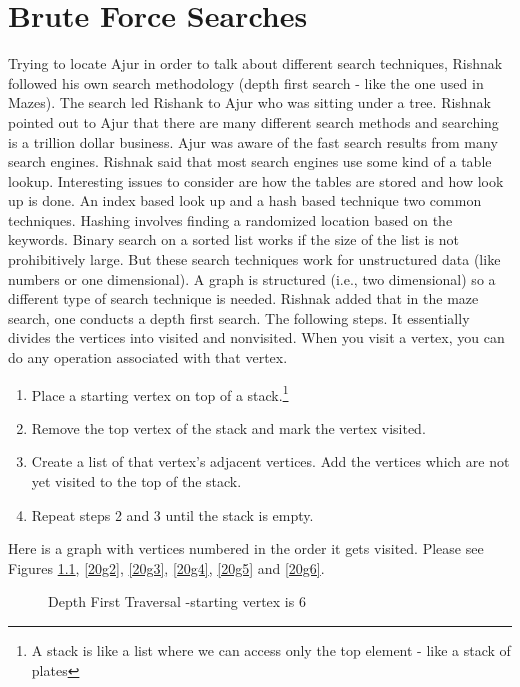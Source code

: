 \chapter{Brute Force Searches}

Trying to locate Ajur in order to talk about different search techniques, Rishnak followed his own search methodology (depth first search - like the one used in Mazes). The search led Rishank to Ajur who was sitting under a tree. Rishnak pointed out to Ajur that there are many different search methods and searching is a trillion dollar business. Ajur was aware of the fast search results from many search engines. Rishnak said that most search engines use some kind of a table lookup. Interesting issues to consider are how the tables are stored and how look up is done.  An index based look up and a hash based technique two common techniques. Hashing involves finding a randomized location based on the keywords.  Binary search on a sorted list works if the size of the list is not prohibitively large. But these search techniques work for unstructured data (like numbers or one dimensional). A graph is structured (i.e., two dimensional) so a different type of search technique is needed.
Rishnak added that in the maze search, one conducts a depth first search. The following steps. It essentially divides the vertices into visited and nonvisited. When you visit a vertex, you can do any
operation associated with that vertex.

\begin{enumerate}
    \item Place a starting vertex on top of a stack.\footnote{A stack is like a list where we can access only the top element - like a stack of plates}
     \item Remove the top vertex of the stack and mark the vertex visited.
     \item Create a list of that vertex's adjacent vertices. Add the vertices which are not yet visited  to the top of the stack.
     \item Repeat steps 2 and 3 until the stack is empty.
\end{enumerate}

Here is a graph with vertices numbered in the order it gets visited. Please see Figures \ref{20g1}, \ref{20g2}, \ref{20g3}, \ref{20g4}, \ref{20g5} and \ref{20g6}. 
\begin{figure}
\begin{center}
\caption{ Depth First Traversal -starting vertex is 6}\label{20g1}
\end{center}
\end{figure}

